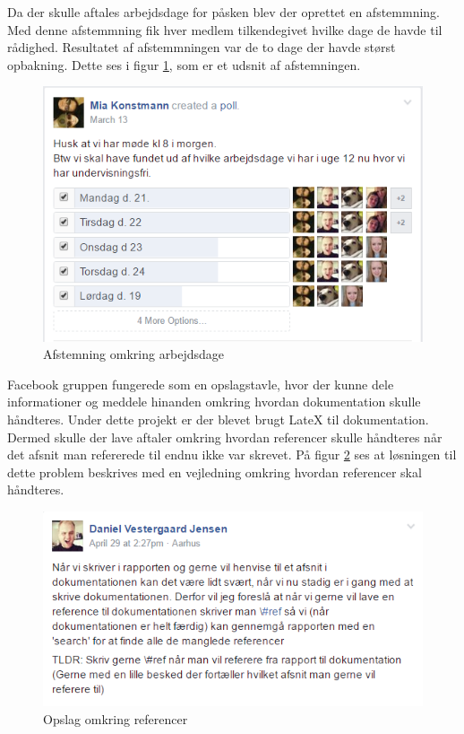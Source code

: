 Da der skulle aftales arbejdsdage for påsken blev der oprettet en afstemmning. Med denne afstemmning fik hver medlem tilkendegivet hvilke dage de havde til rådighed. Resultatet af afstemmningen var de to dage der havde størst opbakning. Dette ses i figur \ref{ref:fbpoll}, som er et udsnit af afstemningen.
\begin{figure}[H]
	\centering
	\includegraphics[scale=0.6]{Projektgennemfoerelse/images/fbpoll}
	\caption{Afstemning omkring arbejdsdage}
	\label{ref:fbpoll}
\end{figure}

Facebook gruppen fungerede som en opslagstavle, hvor der kunne dele informationer og meddele hinanden omkring hvordan dokumentation skulle håndteres. Under dette projekt er der blevet brugt LateX til dokumentation. Dermed skulle der lave aftaler omkring hvordan referencer skulle håndteres når det afsnit man refererede til endnu ikke var skrevet. På figur \ref{ref:fblatex} ses at løsningen til dette problem beskrives med en vejledning omkring hvordan referencer skal håndteres.

\begin{figure}[H]
	\centering
	\includegraphics[scale=0.6]{Projektgennemfoerelse/images/fblatex}
	\caption{Opslag omkring referencer}
	\label{ref:fblatex}
\end{figure}


